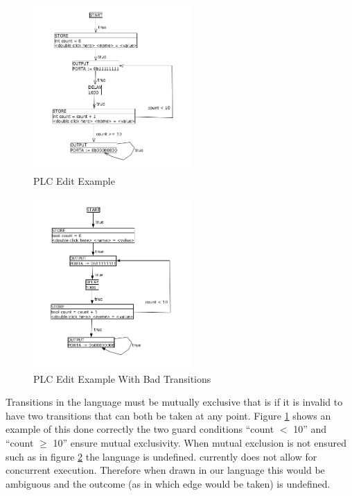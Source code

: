 \begin{figure}[htp]
    \centering
    \includegraphics[width=230px]{./images/tool_transition_example.png}
    \caption{PLC Edit Example}
    \label{fig:tool_transition_example}
\end{figure}

\begin{figure}[htp]
    \centering
    \includegraphics[width=230px]{./images/tool_transition_example_bad.png}
    \caption{PLC Edit Example With Bad Transitions}
    \label{fig:tool_transition_example_bad}
\end{figure}

Transitions in the language must be mutually exclusive that is if it is invalid to have two transitions that can both be taken at any point. Figure \ref{fig:tool_transition_example} shows an example of this done correctly the two guard conditions ``count $<$ 10'' and ``count $\geq$ 10'' ensure mutual exclusivity. When mutual exclusion is not ensured such as in figure \ref{fig:tool_transition_example_bad} the language is undefined. \plccharts currently does not allow for concurrent execution. Therefore when drawn in our language this would be ambiguous and the outcome (as in which edge would be taken) is undefined.